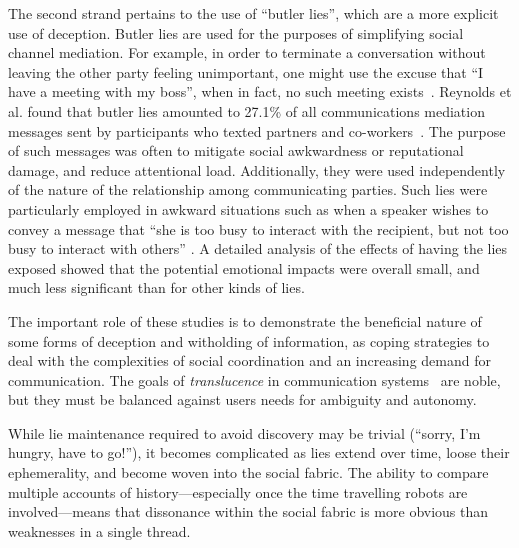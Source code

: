 \documentclass{IOS-Book-Article}     %
\begin{document}
The second strand pertains to the use of ``butler lies'', which are a more
explicit use of deception. Butler lies are used for the purposes of simplifying
social channel mediation. For example, in order to terminate a conversation
without leaving the other party feeling unimportant, one might use the excuse
that ``I have a meeting with my boss'', when in fact, no such meeting 
exists~\cite{Hancock:2009:BLA:1518701.1518782}.  
Reynolds et al. found that butler lies amounted to 27.1\% of all
communications mediation messages sent by participants who texted partners and
co-workers~\cite{Reynolds:2013:BLB:2441776.2441862}. 
The purpose of such messages was often to mitigate social
awkwardness or reputational damage, and reduce attentional load. Additionally,
they were used independently of the nature of the relationship among
communicating parties.  Such lies were
particularly employed in awkward situations such as when a speaker 
wishes to convey a message that ``she is too
busy to interact with the recipient, but not too busy to interact with others''
\cite{Reynolds:2013:BLB:2441776.2441862}.  A detailed analysis of the effects 
of having the lies exposed showed that the potential emotional impacts were
overall small, and much less significant than for other kinds of lies.                    

The important role of these studies is to demonstrate the beneficial nature of
some forms of deception and witholding of information, as 
coping strategies to deal with the complexities of social coordination and
an increasing demand for communication. The goals of \emph{translucence} in
communication systems~\cite{erickson2000Translucence} are noble, but they must
be balanced against users needs for ambiguity and autonomy.

While lie maintenance required to avoid discovery may be trivial (``sorry, I'm
hungry, have to go!''), it becomes complicated as lies
extend over time, loose their ephemerality, and become woven into the social
fabric.
The ability to compare multiple accounts of history---especially once the time travelling
robots are involved---means that dissonance within the social
fabric is more obvious than weaknesses in a single thread.


\end{document}
